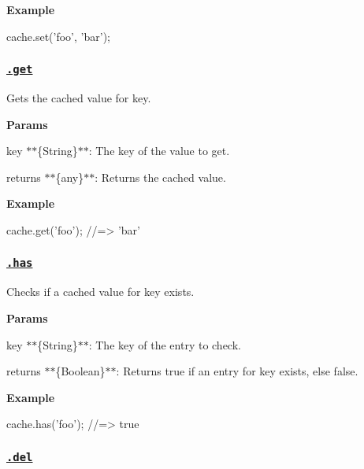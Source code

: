 {\bfseries Example}


\begin{DoxyCode}
cache.set('foo', 'bar');
\end{DoxyCode}


\subsubsection*{\href{index.js#L65}{\tt .get}}

Gets the cached value for {\ttfamily key}.

{\bfseries Params}


\begin{DoxyItemize}
\item {\ttfamily key} $\ast$$\ast$\{String\}$\ast$$\ast$\+: The key of the value to get.
\item {\ttfamily returns} $\ast$$\ast$\{any\}$\ast$$\ast$\+: Returns the cached value.
\end{DoxyItemize}

{\bfseries Example}


\begin{DoxyCode}
cache.get('foo');
//=> 'bar'
\end{DoxyCode}


\subsubsection*{\href{index.js#L82}{\tt .has}}

Checks if a cached value for {\ttfamily key} exists.

{\bfseries Params}


\begin{DoxyItemize}
\item {\ttfamily key} $\ast$$\ast$\{String\}$\ast$$\ast$\+: The key of the entry to check.
\item {\ttfamily returns} $\ast$$\ast$\{Boolean\}$\ast$$\ast$\+: Returns {\ttfamily true} if an entry for {\ttfamily key} exists, else {\ttfamily false}.
\end{DoxyItemize}

{\bfseries Example}


\begin{DoxyCode}
cache.has('foo');
//=> true
\end{DoxyCode}


\subsubsection*{\href{index.js#L98}{\tt .del}}

